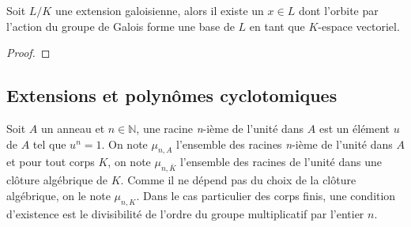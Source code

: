 \documentclass[a4paper]{article} %
\numberwithin{section}{part}
\numberwithin{equation}{section}
\newcommand\nroot[1]{\textit{#1}-ième}
\newcommand\NN{\mathbb{N}}
\begin{document}
\begin{thm}
Soit $L/K$ une extension galoisienne, alors il existe un $x\in L$ dont l'orbite
par l'action du groupe de Galois forme une base de $L$ en tant que $K$-espace
vectoriel.
\end{thm}
\begin{proof}
\end{proof}

\subsection{Extensions et polynômes cyclotomiques}
Soit $A$ un anneau et $n\in\NN$, une racine \nroot{n} de l'unité dans $A$ est un
élément $u$ de $A$ tel que $u^n = 1$. On note $\mu_{n,A}$ l'ensemble des racines
\nroot{n} de l'unité dans $A$ et pour tout corps $K$, on note $\mu_{n,\bar{K}}$ 
l'ensemble des racines de l'unité dans une clôture algébrique de $K$. Comme il 
ne dépend pas du choix de la clôture algébrique, on le note $\mu_{n,K}$. Dans le
cas particulier des corps finis, une condition d'existence est le divisibilité
de l'ordre du groupe multiplicatif par l'entier $n$.\par
\end{document}
